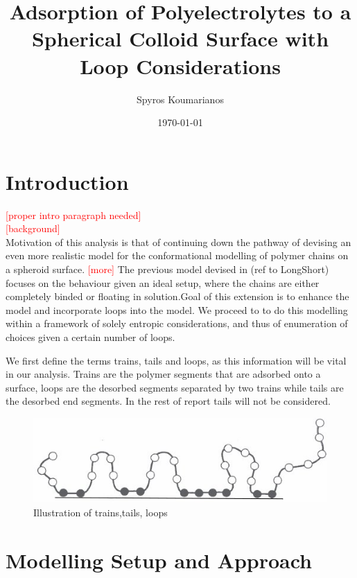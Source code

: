 \documentclass[10pt,letterpaper]{article}
\title{Adsorption of Polyelectrolytes to a Spherical Colloid Surface with Loop Considerations}
\author{Spyros Koumarianos}
\date{\today}
\begin{document}
\maketitle

\newpage

\section*{Introduction}
\noindent \textcolor{red}{[proper intro paragraph needed]}\\

\noindent \textcolor{red}{[background]}\\

Motivation of this analysis is that of continuing down the pathway of devising an even more realistic model for the conformational modelling of polymer chains on a spheroid surface. \textcolor{red}{[more]}
The previous model devised in (ref to LongShort) focuses on the behaviour given an ideal setup, where the chains are either completely binded or floating in solution.Goal of this extension is to enhance the model and incorporate loops into the model. We proceed to to do this modelling within a framework of solely entropic considerations, and thus of enumeration of choices given a certain number of loops.

We first define the  terms trains, tails and loops, as this information will be vital in our analysis. Trains are the polymer segments that are adsorbed onto a surface, loops are the  desorbed segments separated by two trains while tails are the desorbed end segments. In the rest of report tails will not be considered. 

\begin{figure}[H]
	\centering
	\includegraphics[scale=0.5]{Clipboard.png}
	\caption{Illustration of trains,tails, loops \cite{fleer1993polymers}}
	\label{fig:gull}
\end{figure}



\section*{Modelling Setup and Approach}
\end{document}
